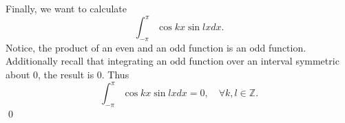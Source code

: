 \documentclass[10pt]{amsart}
\theoremstyle{nonumberplain}
\begin{document}
\begin{enumerate}[label={\bf {\arabic*}:}]
\noindent
Finally, we want to calculate
$$
\int_{-\pi}^{\pi} \cos kx \sin l x dx.
$$
Notice, the product of an even and an odd function is an odd function.
Additionally recall that integrating an odd function over an interval symmetric about 0, the result is 0.
Thus
$$
\int_{-\pi}^{\pi} \cos kx \sin l x dx = 0, \quad \forall k, l \in \mathbb Z.
$$
\qed \\
\end{enumerate}
\end{document}
